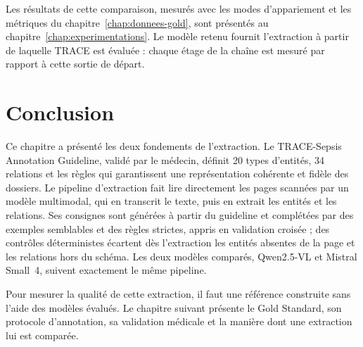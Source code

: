 Les résultats de cette comparaison, mesurés avec les modes d'appariement et les métriques du chapitre~\ref{chap:donnees-gold}, sont présentés au chapitre~\ref{chap:experimentations}. Le modèle retenu fournit l'extraction à partir de laquelle TRACE est évaluée : chaque étage de la chaîne est mesuré par rapport à cette sortie de départ.

\section{Conclusion}\label{sec:c4-conclusion}

Ce chapitre a présenté les deux fondements de l'extraction. Le TRACE-Sepsis Annotation Guideline, validé par le médecin, définit 20 types d'entités, 34 relations et les règles qui garantissent une représentation cohérente et fidèle des dossiers. Le pipeline d'extraction fait lire directement les pages scannées par un modèle multimodal, qui en transcrit le texte, puis en extrait les entités et les relations. Ses consignes sont générées à partir du guideline et complétées par des exemples semblables et des règles strictes, appris en validation croisée ; des contrôles déterministes écartent dès l'extraction les entités absentes de la page et les relations hors du schéma. Les deux modèles comparés, Qwen2.5-VL et Mistral Small~4, suivent exactement le même pipeline.

Pour mesurer la qualité de cette extraction, il faut une référence construite sans l'aide des modèles évalués. Le chapitre suivant présente le Gold Standard, son protocole d'annotation, sa validation médicale et la manière dont une extraction lui est comparée.
